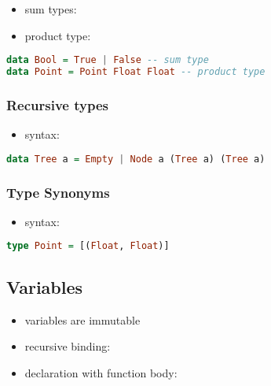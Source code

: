 \documentclass[a4paper,landscape,10pt]{article}
\begin{document}
\begin{multicols*}{2}
  \begin{itemize}
    \item sum types: 
    \item product type: 
  \end{itemize}

  \begin{lstlisting}[language=Haskell]
data Bool = True | False -- sum type
data Point = Point Float Float -- product type
\end{lstlisting}

  \subsubsection{Recursive types}

  \begin{itemize}
    \item syntax: 
  \end{itemize}

  \begin{lstlisting}[language=Haskell]
data Tree a = Empty | Node a (Tree a) (Tree a)
\end{lstlisting}

  \subsubsection{Type Synonyms}

  \begin{itemize}
    \item syntax: 
  \end{itemize}

  \begin{lstlisting}[language=Haskell]
type Point = [(Float, Float)]
\end{lstlisting}

  \subsection{Variables}

  \begin{itemize}
    \item variables are immutable
    \item recursive binding: 
    \item declaration with function body: 
  \end{itemize}


\end{multicols*}
\end{document}
